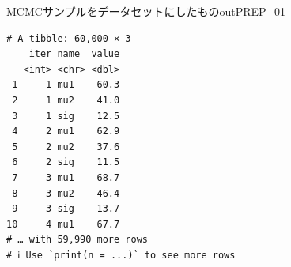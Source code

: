 \begin{Rscreen}{MCMCサンプルをデータセットにしたもの}{outPREP_01}
	\begin{verbatim}
# A tibble: 60,000 × 3
    iter name  value
   <int> <chr> <dbl>
 1     1 mu1    60.3
 2     1 mu2    41.0
 3     1 sig    12.5
 4     2 mu1    62.9
 5     2 mu2    37.6
 6     2 sig    11.5
 7     3 mu1    68.7
 8     3 mu2    46.4
 9     3 sig    13.7
10     4 mu1    67.7
# … with 59,990 more rows
# ℹ Use `print(n = ...)` to see more rows
  \end{verbatim}
\end{Rscreen}
